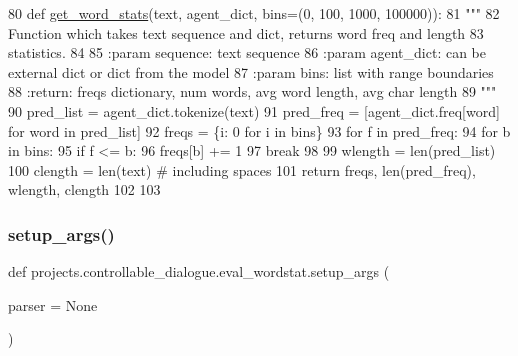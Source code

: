 \begin{DoxyCode}
80 \textcolor{keyword}{def }\hyperlink{namespaceprojects_1_1controllable__dialogue_1_1eval__wordstat_af8f7aeddab4a5c7f0a5597bdb09f40ae}{get\_word\_stats}(text, agent\_dict, bins=(0, 100, 1000, 100000)):
81     \textcolor{stringliteral}{"""}
82 \textcolor{stringliteral}{    Function which takes text sequence and dict, returns word freq and length}
83 \textcolor{stringliteral}{    statistics.}
84 \textcolor{stringliteral}{}
85 \textcolor{stringliteral}{    :param sequence: text sequence}
86 \textcolor{stringliteral}{    :param agent\_dict: can be external dict or dict from the model}
87 \textcolor{stringliteral}{    :param bins: list with range boundaries}
88 \textcolor{stringliteral}{    :return: freqs dictionary, num words, avg word length, avg char length}
89 \textcolor{stringliteral}{    """}
90     pred\_list = agent\_dict.tokenize(text)
91     pred\_freq = [agent\_dict.freq[word] \textcolor{keywordflow}{for} word \textcolor{keywordflow}{in} pred\_list]
92     freqs = \{i: 0 \textcolor{keywordflow}{for} i \textcolor{keywordflow}{in} bins\}
93     \textcolor{keywordflow}{for} f \textcolor{keywordflow}{in} pred\_freq:
94         \textcolor{keywordflow}{for} b \textcolor{keywordflow}{in} bins:
95             \textcolor{keywordflow}{if} f <= b:
96                 freqs[b] += 1
97                 \textcolor{keywordflow}{break}
98 
99     wlength = len(pred\_list)
100     clength = len(text)  \textcolor{comment}{# including spaces}
101     \textcolor{keywordflow}{return} freqs, len(pred\_freq), wlength, clength
102 
103 
\end{DoxyCode}
\mbox{\label{namespaceprojects_1_1controllable__dialogue_1_1eval__wordstat_aa40ff30af74bd5824589612828146ec8}} 
\subsubsection{\texorpdfstring{setup\+\_\+args()}{setup\_args()}}
{\footnotesize\ttfamily def projects.\+controllable\+\_\+dialogue.\+eval\+\_\+wordstat.\+setup\+\_\+args (\begin{DoxyParamCaption}\item[{}]{parser = {\ttfamily None} }\end{DoxyParamCaption})}



